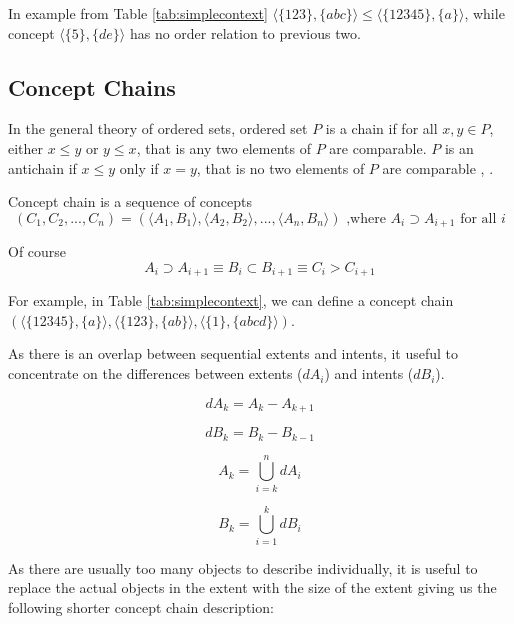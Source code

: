 \documentclass[acmconf,authordraft]{acmart}
\begin{document}
In example from Table \ref{tab:simplecontext}   $\langle \{123\}, \{abc\} \rangle \leq \langle \{12345\}, \{a\} \rangle$, while concept $\langle \{5\}, \{de\} \rangle$ has no order relation to previous two.

\subsection{Concept Chains}

In the general theory of ordered sets, ordered set $P$ is a chain if for all $x, y \in P$, either $x \leq y$ or $y \leq x$, that is any two elements of $P$ are comparable. $P$ is an antichain if $x \leq y$ only if $x=y$, that is no two elements of $P$ are comparable \cite{davey_introduction_2002}, \cite{ore_chains_1943}.

Concept chain is a sequence of concepts
\begin{equation}
  (C_1, C_2,..., C_n) = (\langle A_1, B_1 \rangle,\langle A_2,B_2 \rangle,  ..., \langle A_n,B_n \rangle)  \text{ ,where  }  A_i \supset  A_{i+1} \text{ for all } i
\end{equation}

Of course
\begin{displaymath}
A_i \supset A_{i+1} \equiv B_i \subset B_{i+1} \equiv C_i > C_{i+1}
\end{displaymath}

For example, in Table \ref{tab:simplecontext}, we can define a concept chain 
$(\langle \{12345\}, \{a\} \rangle,
 \langle \{123\}, \{ab\} \rangle,  
 \langle \{1\}, \{abcd\} \rangle)$.

As there is an overlap between sequential extents and intents, it useful to concentrate on the differences between extents ($dA_i$) and intents ($dB_i$).

\begin{equation}
dA_k = A_k - A_{k+1}
\end{equation}

\begin{equation}
dB_k = B_k - B_{k-1}
\end{equation}

\begin{equation}
A_k = \bigcup_{i=k}^{n} dA_i
\end{equation}

\begin{equation}
B_k = \bigcup_{i=1}^{k} dB_i
\end{equation}

As there are usually too many objects to describe  individually, it is useful to replace the actual objects in the extent with the size of the extent giving us the following shorter concept chain description:
\end{document}
